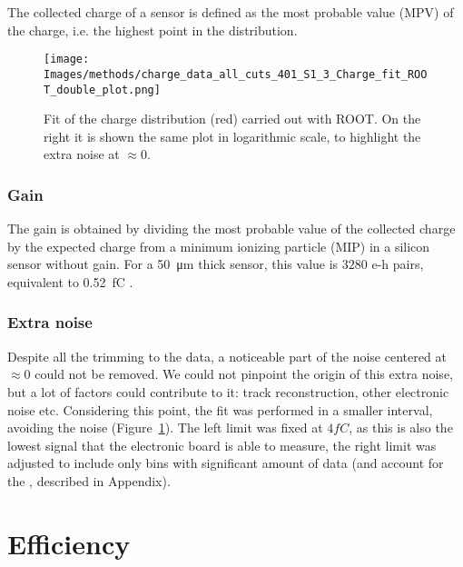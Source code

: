 The collected charge of a sensor is defined as the most probable value (MPV) of the charge, i.e. the highest point in the distribution.

\begin{figure}[h!tbp]
    \centering
    \texttt{[image: Images/methods/charge\_data\_all\_cuts\_401\_S1\_3\_Charge\_fit\_ROOT\_double\_plot.png]}
    \captionsetup{width=\captionwidth}
    \caption{Fit of the charge distribution (red) carried out with ROOT. On the right it is shown the same plot in logarithmic scale, to highlight the extra noise at \(\approx 0\).}
    \label{fig:charge_ROOT_fit}
\end{figure}

\subsubsection{Gain}
The gain is obtained by dividing the most probable value of the collected charge by the expected charge from a minimum ionizing particle (MIP) in a silicon sensor without gain. For a \qty{50}{\micro\meter} thick sensor, this value is \(3280\) e-h pairs, equivalent to \qty{.52}{\femto\coulomb} \cite{meroli_energy_loss2011}.

\subsubsection{Extra noise}
Despite all the trimming to the data, a noticeable part of the noise centered at \(\approx 0\) could not be removed. We could not pinpoint the origin of this extra noise, but a lot of factors could contribute to it: track reconstruction, other electronic noise etc.
Considering this point, the fit was performed in a smaller interval, avoiding the noise (Figure~\ref{fig:charge_ROOT_fit}). The left limit was fixed at \(4\si{fC}\), as this is also the lowest signal that the electronic board is able to measure, the right limit was adjusted to include only bins with significant amount of data (and account for the , described in Appendix).



\section{Efficiency}\label{sec:methods_efficiency}

